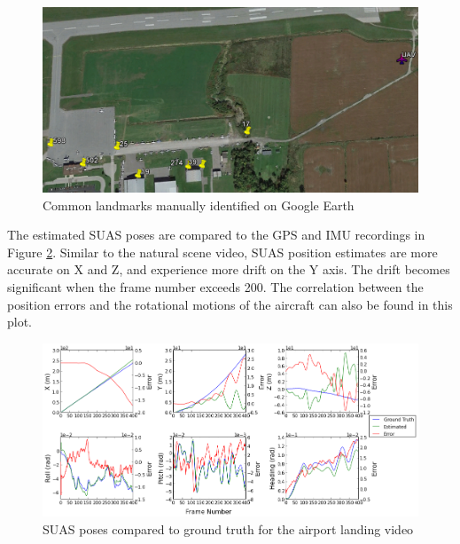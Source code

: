 \begin{figure}[h]
\centering
\includegraphics[width=13cm, keepaspectratio=true]
{./Figures/fltfig/airport/uav_and_identified_landmark.png}
\caption{Common landmarks manually identified on Google Earth }
\label{fltfig:12}
\end{figure}
\FloatBarrier 

The estimated SUAS poses are compared to the GPS
and IMU recordings in Figure \ref{fltfig:13}. Similar to the natural
scene video, SUAS position estimates are more accurate on X and Z,
and experience more drift on the Y axis. The drift becomes significant
when the frame number exceeds 200. The correlation between the position errors
and the rotational motions of the aircraft can also be found in this
plot.

\begin{figure}[h]
\centering
\includegraphics[width=17cm, keepaspectratio=true]
{./Figures/fltfig/airport/Figure10.png}
\caption{SUAS poses compared to ground truth for the airport landing video}
\label{fltfig:13}
\end{figure}
\FloatBarrier

